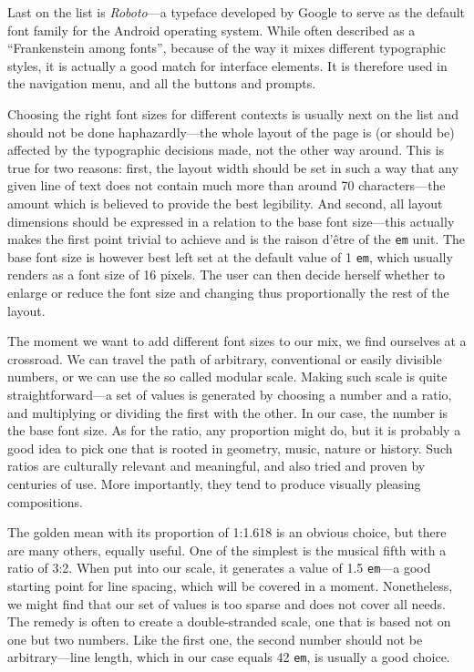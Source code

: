 \documentclass[thesis=M,english,hidelinks]{FITthesis}[2012/10/20]
\newcommand{\code}{\texttt}
\begin{document}
Last on the list is \textit{Roboto}---a typeface developed by Google to serve as the default font family for the Android operating system. While often described as a ``Frankenstein among fonts'', because of the way it mixes different typographic styles, it is actually a good match for interface elements. It is therefore used in the navigation menu, and all the buttons and prompts.

Choosing the right font sizes for different contexts is usually next on the list and should not be done haphazardly---the whole layout of the page is (or should be) affected by the typographic decisions made, not the other way around. This is true for two reasons: first, the layout width should be set in such a way that any given line of text does not contain much more than around 70 characters---the amount which is believed to provide the best legibility. And second, all layout dimensions should be expressed in a relation to the base font size---this actually makes the first point trivial to achieve and is the raison d'être of the \code{em} unit. The base font size is however best left set at the default value of 1 \code{em}, which usually renders as a font size of 16 pixels. The user can then decide herself whether to enlarge or reduce the font size and changing thus proportionally the rest of the layout.

The moment we want to add different font sizes to our mix, we find ourselves at a crossroad. We can travel the path of arbitrary, conventional or easily divisible numbers, or we can use the so called modular scale. Making such scale is quite straightforward---a set of values is generated by choosing a number and a ratio, and multiplying or dividing the first with the other. In our case, the number is the base font size. As for the ratio, any proportion might do, but it is probably a good idea to pick one that is rooted in geometry, music, nature or history. Such ratios are culturally relevant and meaningful, and also tried and proven by centuries of use. More importantly, they tend to produce visually pleasing compositions.

The golden mean with its proportion of 1:1.618 is an obvious choice, but there are many others, equally useful. One of the simplest is the musical fifth with a ratio of 3:2. When put into our scale, it generates a value of 1.5 \code{em}---a good starting point for line spacing, which will be covered in a moment. Nonetheless, we might find that our set of values is too sparse and does not cover all needs. The remedy is often to create a double-stranded scale, one that is based not on one but two numbers. Like the first one, the second number should not be arbitrary---line length, which in our case equals 42 \code{em}, is usually a good choice.
\end{document}
